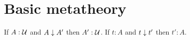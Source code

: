 \documentclass[hott-all.tex]{subfiles}
\begin{document}
\section{Basic metatheory}
%
%
%
%
%
%
\begin{thm}
If $A : \mathcal{U}$ and $A \downarrow A'$ then $A' : \mathcal{U}$.
If $t:A$ and $t \downarrow t'$ then $t':A$.
\end{thm}
%
\end{document}
